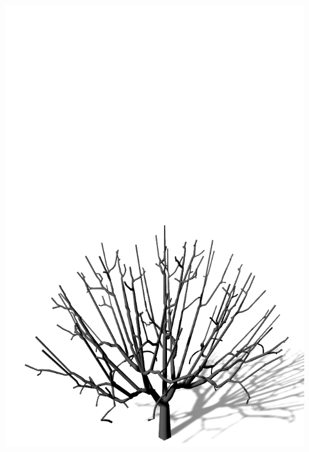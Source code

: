\newpage
\begin{center}
	\vfill
	\begin{minipage}[c]{0.45\textwidth}
		\centering
		\includegraphics[height=.9\textheight]{images/SCA_GewWachstum_Off}
	\end{minipage}
	\hspace{.05\textwidth}	
	\begin{minipage}[c]{0.45\textwidth}
		\centering

\end{minipage}
\end{center}
